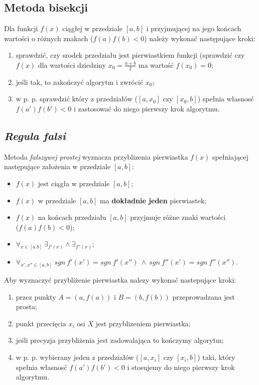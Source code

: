 \documentclass[a4paper,11pt]{article}
\begin{document}
  \subsection{Metoda bisekcji}
  Dla funkcji \( f(x) \) ciągłej w przedziale \( [a,b] \) i przyjmującej na jego końcach wartości o różnych znakach (\( f(a) f(b) < 0 \)) należy wykonać następujące kroki:
  \begin{enumerate}
    \item sprawdzić, czy srodek przedziału jest pierwiastkiem funkcji (sprawdzić czy \( f(x) \) dla wartości dziedziny \(x_0 = \frac {a + b} {2} \) ma wartość \(f(x_0) = 0 \);
    \item jeśli tak, to zakończyć algorytm i zwrócić \(x_0\);
    \item w p. p. sprawdzić który z przedziałów (\( [a, x_0] \) czy \( [x_0, b] \)) spełnia własnosć \( f(a')f(b') < 0 \) i zastosować do niego pierwszy krok algorytmu.
  \end{enumerate}
  
  \subsection{\emph{Regula falsi}}
  Metoda \emph{fałszywej prostej} wyznacza przyblizenia pierwiastka \( f(x) \) spełniającej następujące założenia w przedziale \([a, b]\):
  \begin{itemize}
    \item \( f(x) \) jest ciągła w przedziale \( [a,b] \);
    \item \( f(x) \) w przedziale \( [a,b] \) ma \textbf{dokładnie jeden} pierwiastek;
    \item \( f(x) \) na końcach przedziału \( [a,b] \) przyjmuje różne znaki wartości \\(\( f(a) f(b) < 0 \));
    \item \( \forall_{x \in [a.b]} \: \exists_{f'(x)} \wedge \exists_{f''(x)}\);
    \item \( \forall_{x', x''\in [a,b]}\; sgn\: f'(x') = sgn \: f'(x'') \: \wedge \: sgn \: f''(x') = sgn \: f''(x'') \).
  \end{itemize}
  Aby wyznaczyć przybliżenie pierwiastka nalezy wykonać nastepujące kroki:
  \begin{enumerate}
    \item przez punkty \(A = (a, f(a))\) i \(B = (b, f(b))\) przeprowadzana jest prosta;
    \item punkt przecięcia \(x_i\) osi \(X\) jest przyblizeniem pierwiastka;
    \item jeśli precyzja przybliżenia jest zadowalająca to kończymy algorytm;
    \item w p. p. wybierany jeden z przedziałów (\( [a, x_i] \) czy \( [x_i, b] \)) taki, który spełnia własnosć \( f(a')f(b') < 0 \) i stosujemy do niego pierwszy krok algorytmu.
  \end{enumerate}
\end{document}
